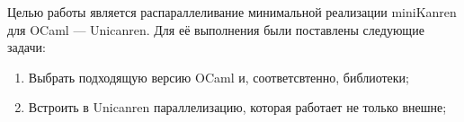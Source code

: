 
\label{sec:task}
 Целью работы является распараллеливание минимальной реализации miniKanren для OCaml --- Unicanren. Для её выполнения были поставлены следующие задачи:
 \begin{enumerate}
 \item  Выбрать подходящую версию OCaml и, соответсвтенно, библиотеки;
 \item  Встроить в Unicanren параллелизацию, которая работает не только внешне;
\end{enumerate}
